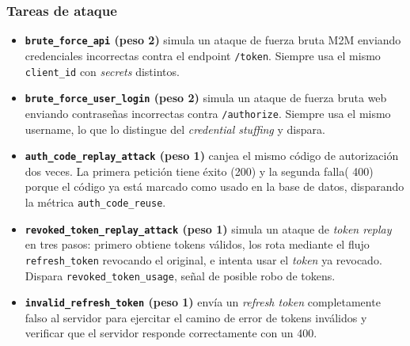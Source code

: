 \documentclass[12pt, a4paper]{article}
\begin{document}
			\subsubsection{Tareas de ataque}
				\begin{itemize}
						\item \textbf{\texttt{brute\_force\_api} (peso 2)} simula un ataque de fuerza bruta M2M enviando credenciales incorrectas contra el endpoint \texttt{/token}. Siempre usa el mismo \texttt{client\_id} con \textit{secrets} distintos.
						\item \textbf{\texttt{brute\_force\_user\_login} (peso 2)} simula un ataque de fuerza bruta web enviando contraseñas incorrectas contra \texttt{/authorize}. Siempre usa el mismo username, lo que lo distingue del \textit{credential stuffing} y dispara.
						\item \textbf{\texttt{auth\_code\_replay\_attack} (peso 1)} canjea el mismo código de autorización dos veces. La primera petición tiene éxito (200) y la segunda falla( 400) porque el código ya está marcado como usado en la base de datos, disparando la métrica \texttt{auth\_code\_reuse}.
						\item \textbf{\texttt{revoked\_token\_replay\_attack} (peso 1)} simula un ataque de \textit{token replay} en tres pasos: primero obtiene tokens válidos, los rota mediante el flujo \texttt{refresh\_token} revocando el original, e intenta usar el\textit{ token} ya revocado. Dispara \texttt{revoked\_token\_usage}, señal de posible robo de tokens.
						\item 	\textbf{\texttt{invalid\_refresh\_token} (peso 1)} envía un\textit{ refresh token} completamente falso al servidor para ejercitar el camino de error de tokens inválidos y verificar que el servidor responde correctamente con un 400.
				\end{itemize}
			
\end{document}
